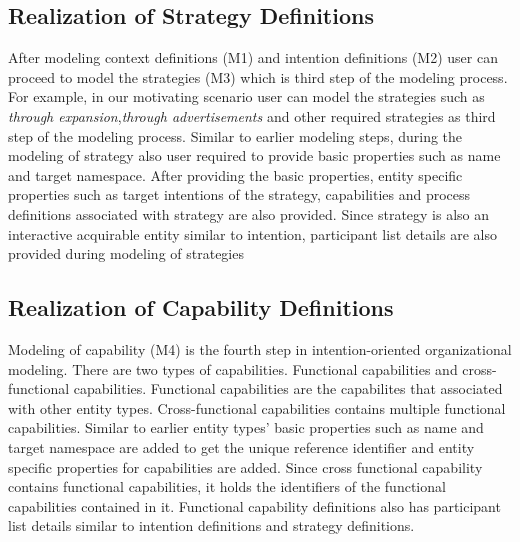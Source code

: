 \subsection{Realization of Strategy Definitions}
After modeling context definitions (M1) and intention definitions (M2) user can proceed to model the strategies (M3) which is third step of the modeling process. For example, in our motivating scenario user can model the strategies such as \textit{through expansion},\textit{through advertisements} and other required strategies as third step of the modeling process. Similar to earlier modeling steps, during the modeling of strategy also user required to provide basic properties such as name and target namespace. After providing the basic properties, entity specific properties such as target intentions of the strategy, capabilities and process definitions associated with strategy are also provided. Since strategy is also an interactive acquirable entity similar to intention, participant list details are also provided during modeling of strategies

\subsection{Realization of Capability Definitions}
Modeling of capability (M4) is the fourth step in intention-oriented organizational modeling. There are two types of capabilities. Functional capabilities and cross-functional capabilities. Functional capabilities are the capabilites that associated with other entity types. Cross-functional capabilities contains multiple functional capabilities. Similar to earlier entity types' basic properties such as name and target namespace are added to get the unique reference identifier and entity specific properties for capabilities are added. Since cross functional capability contains functional capabilities, it holds the identifiers of the functional capabilities contained in it. Functional capability definitions also has participant list details similar to intention definitions and strategy definitions. 

